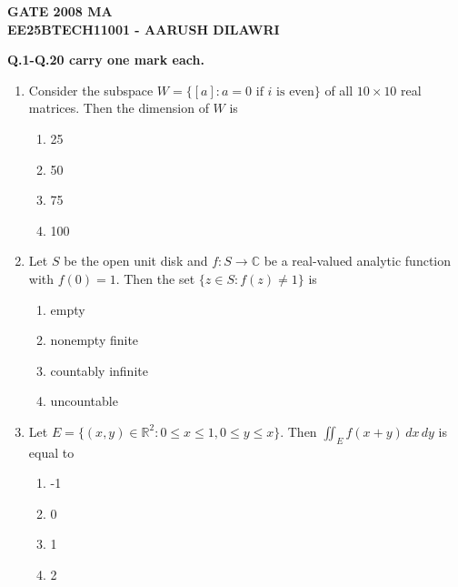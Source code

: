 \documentclass[journal]{IEEEtran}
\numberwithin{equation}{enumi}
\numberwithin{figure}{enumi}
\begin{document}


\begin{center}
    \LARGE \textbf{GATE 2008 MA}\\[0.5em]
    \large \textbf{EE25BTECH11001 - AARUSH DILAWRI}
\end{center}
\begin{center}
 \textbf{Q.1-Q.20 carry one mark each.}
\end{center}
\vspace{0.25em}
\begin{enumerate}

\item Consider the subspace \(W = \{[a]: a=0 \text{ if } i \text{ is even}\}\) of all \(10 \times 10\) real matrices. Then the dimension of \(W\) is
\hfill{}
\begin{multicols}{4}
\begin{enumerate}
\item 25
\item 50
\item 75
\item 100
\end{enumerate}
\end{multicols}

\item Let \(S\) be the open unit disk and \(f: S \to \mathbb{C}\) be a real-valued analytic function with \(f(0) = 1\). Then the set \(\{z \in S: f(z) \neq 1\}\) is
\hfill{}
\begin{multicols}{4}
\begin{enumerate}
\item empty
\item nonempty finite
\item countably infinite
\item uncountable
\end{enumerate}
\end{multicols}

\item Let \(E = \{(x, y) \in \mathbb{R}^2: 0 \leq x \leq 1, 0 \leq y \leq x\}\). Then \(\displaystyle \iint_{E} f(x + y) \, dx\, dy\) is equal to
\hfill{}
\begin{multicols}{4}
\begin{enumerate}
\item -1
\item 0
\item 1
\item 2
\end{enumerate}
\end{multicols}


\end{enumerate}
\end{document}
